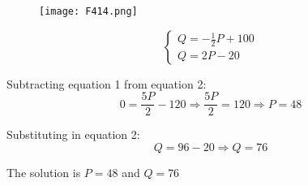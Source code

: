 \begin{frame}
 \begin{figure}
    \centering
    \texttt{[image: F414.png]} %
  \end{figure}
\end{frame}
\begin{frame}

$$ \begin{cases}
  Q = -\frac{1}{2}P + 100 \\
  Q = 2P - 20
\end{cases} $$

Subtracting equation 1 from equation 2:
$$0 = \frac{5P}{2} -120 \Rightarrow  \frac{5P}{2} = 120  \Rightarrow P = 48$$

Substituting in equation 2:
$$Q = 96 - 20 \Rightarrow Q = 76$$

The solution is $P = 48$ and $Q = 76$

\end{frame}






